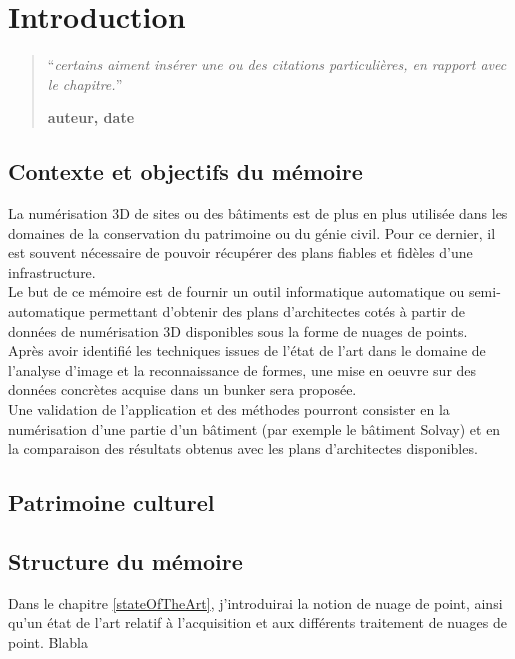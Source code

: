 \chapter{Introduction}
\setcounter{page}{1}
\begin{quotation}
\noindent ``\emph{certains aiment insérer une ou des citations particulières, en rapport avec le chapitre.}''
\begin{flushright}\textbf{auteur, date}\end{flushright}
\end{quotation}

\vspace*{0.5cm}

\section{Contexte et objectifs du mémoire}
La numérisation 3D de sites ou des bâtiments est de plus en plus utilisée dans les domaines de la conservation du patrimoine ou du génie civil. Pour ce dernier, il est souvent nécessaire de pouvoir récupérer des plans fiables et fidèles d'une infrastructure.\\

Le but de ce mémoire est de fournir un outil informatique automatique ou semi-automatique permettant d'obtenir des plans d'architectes cotés à partir de données de numérisation 3D disponibles sous la forme de nuages de points.\\

Après avoir identifié les techniques issues de l'état de l'art dans le domaine de l'analyse d'image et la reconnaissance de formes, une mise en oeuvre sur des données concrètes acquise dans un bunker sera proposée.\\

Une validation de l'application et des méthodes pourront consister en la numérisation d'une partie d'un bâtiment (par exemple le bâtiment Solvay) et en la comparaison des résultats obtenus avec les plans d'architectes disponibles.

\section{Patrimoine culturel}

\section{Structure du mémoire}
Dans le chapitre \ref{stateOfTheArt}, j'introduirai la notion de nuage de point, ainsi qu'un état de l'art relatif à l'acquisition et aux différents traitement de nuages de point.
Blabla


